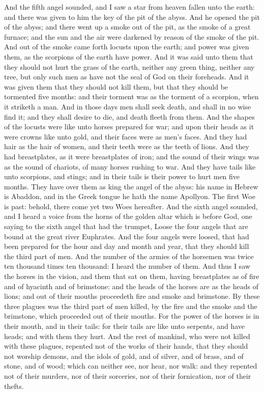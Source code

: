 And the fifth angel sounded, and I saw a star from heaven fallen unto the earth: and there was given to him the key of the pit of the abyss. And he opened the pit of the abyss; and there went up a smoke out of the pit, as the smoke of a great furnace; and the sun and the air were darkened by reason of the smoke of the pit. And out of the smoke came forth locusts upon the earth; and power was given them, as the scorpions of the earth have power. And it was said unto them that they should not hurt the grass of the earth, neither any green thing, neither any tree, but only such men as have not the seal of God on their foreheads. And it was given them that they should not kill them, but that they should be tormented five months: and their torment was as the torment of a scorpion, when it striketh a man. And in those days men shall seek death, and shall in no wise find it; and they shall desire to die, and death fleeth from them. And the shapes of the locusts were like unto horses prepared for war; and upon their heads as it were crowns like unto gold, and their faces were as men’s faces. And they had hair as the hair of women, and their teeth were as the teeth of lions. And they had breastplates, as it were breastplates of iron; and the sound of their wings was as the sound of chariots, of many horses rushing to war. And they have tails like unto scorpions, and stings; and in their tails is their power to hurt men five months. They have over them as king the angel of the abyss: his name in Hebrew is Abaddon, and in the Greek tongue he hath the name Apollyon.  The first Woe is past: behold, there come yet two Woes hereafter.  And the sixth angel sounded, and I heard a voice from the horns of the golden altar which is before God, one saying to the sixth angel that had the trumpet, Loose the four angels that are bound at the great river Euphrates. And the four angels were loosed, that had been prepared for the hour and day and month and year, that they should kill the third part of men. And the number of the armies of the horsemen was twice ten thousand times ten thousand: I heard the number of them. And thus I saw the horses in the vision, and them that sat on them, having breastplates as of fire and of hyacinth and of brimstone: and the heads of the horses are as the heads of lions; and out of their mouths proceedeth fire and smoke and brimstone. By these three plagues was the third part of men killed, by the fire and the smoke and the brimstone, which proceeded out of their mouths. For the power of the horses is in their mouth, and in their tails: for their tails are like unto serpents, and have heads; and with them they hurt. And the rest of mankind, who were not killed with these plagues, repented not of the works of their hands, that they should not worship demons, and the idols of gold, and of silver, and of brass, and of stone, and of wood; which can neither see, nor hear, nor walk: and they repented not of their murders, nor of their sorceries, nor of their fornication, nor of their thefts. 

